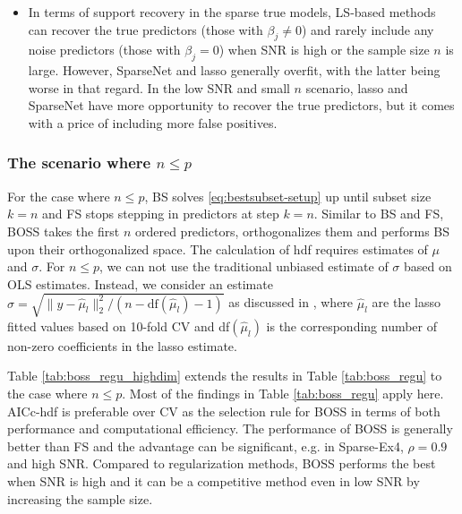 \begin{itemize}
	\item In terms of support recovery in the sparse true models, LS-based methods can recover the true predictors (those with $\beta_j \ne 0$) and rarely include any noise predictors (those with $\beta_j = 0$) when SNR is high or the sample size $n$ is large. However, SparseNet and lasso generally overfit, with the latter being worse in that regard. In the low SNR and small $n$ scenario, lasso and SparseNet have more opportunity to recover the true predictors, but it comes with a price of including more false positives. 

\end{itemize}




\subsubsection{The scenario where \texorpdfstring{$n \le p$}{Lg}}
For the case where $n \le p$, BS solves \eqref{eq:bestsubset-setup} up until subset size $k=n$ and FS stops stepping in predictors at step $k=n$. Similar to BS and FS, BOSS takes the first $n$ ordered predictors, orthogonalizes them and performs BS upon their orthogonalized space. The calculation of hdf requires estimates of $\mu$ and $\sigma$. For $n \le p$, we can not use the traditional unbiased estimate of $\sigma$ based on OLS estimates. Instead, we consider an estimate $\hat{\sigma} = \sqrt{\lVert y-\hat{\mu}_l \rVert_2^2 / (n-\text{df}(\hat{\mu}_l)-1)}$ as discussed in \citet{reid2016study}, where $\hat{\mu}_l$ are the lasso fitted values based on 10-fold CV and df$(\hat{\mu}_l)$ is the corresponding number of non-zero coefficients in the lasso estimate.

Table \ref{tab:boss_regu_highdim} extends the results in Table \ref{tab:boss_regu} to the case where $n \le p$. Most of the findings in Table \ref{tab:boss_regu} apply here. AICc-hdf is preferable over CV as the selection rule for BOSS in terms of both performance and computational efficiency. The performance of BOSS is generally better than FS and the advantage can be significant, e.g. in Sparse-Ex4, $\rho=0.9$ and high SNR. Compared to regularization methods, BOSS performs the best when SNR is high and it can be a competitive method even in low SNR by increasing the sample size.


